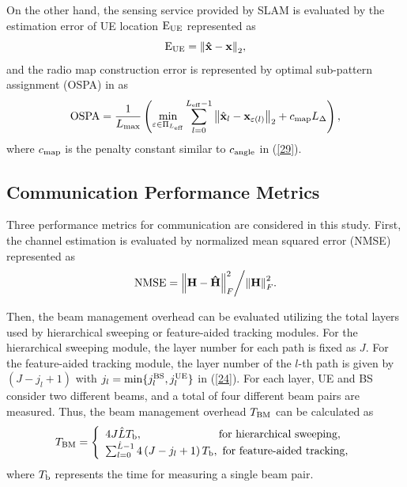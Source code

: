 \documentclass[journal,12pt,onecolumn,draftclsnofoot,]{IEEEtran}
\begin{document}
On the other hand, the sensing service provided by SLAM is evaluated by the estimation error of UE location ${{\rm{E}}_{{\rm{UE}}}}$ represented as
\begin{equation}
\label{30}
{{\rm{E}}_{{\rm{UE}}}} = {\left\| {{\bf{\hat x}} - {\bf{x}}} \right\|}_2,
\end{equation}
and the radio map construction error is represented by optimal sub-pattern assignment (OSPA) in \cite{a6} as 
\begin{equation}
\label{31}
{\rm{OSPA}} = \frac{1}{{{L_{{\rm{max}}}}}}\left({\mathop {\min }\limits_{\varepsilon \in {{\rm{\Pi }}_{{{L_{{\rm{eff}}}}}}}} \mathop \sum \limits_{l = 0}^{{L_{{\rm{eff}}}} - 1} 
\left\|{{\hat {\bf {x}}}_l} - {\bf{x}}_{\varepsilon \left(l \right)}\right\|_2 
+ {c_{{\rm{map}}}}{L_{\rm{\Delta }}}} \right),
\end{equation}
\noindent where ${c_{{\rm{map}}}}$ is the penalty constant similar to ${c_{{\rm{angle}}}}$ in (\ref{29}).
\vspace{-3mm}
\subsection{Communication Performance Metrics}
Three performance metrics for communication are considered in this study.
First, the channel estimation is evaluated by normalized mean squared error (NMSE) represented as 
\begin{equation}
\label{32}
{\rm{NMSE}} = {{ {\left\| {\bf{H}} - {\bf{\hat H}} \right\|}_F^2 }}\bigg/{{ {\left\| {\bf{H}} \right\|}_F^2 }}.
\end{equation}

Then, the beam management overhead can be evaluated utilizing the total layers used by hierarchical sweeping or feature-aided tracking modules. 
For the hierarchical sweeping module, the layer number for each path is fixed as $J$. 
For the feature-aided tracking module, the layer number of the $l$-th path is given by $(J-{j_l}+1)$ with ${j_l} = \min \{ j_l^{{\rm{BS}}},j_l^{{\rm{UE}}}\} $ in (\ref{24}). 
For each layer, UE and BS consider two different beams, and a total of four different beam pairs are measured. Thus, the beam management overhead ${T}_{\rm BM}$ can be calculated as
\begin{equation}
\label{33}
{{{T}}_{{\rm{BM}}}} = \left\{ {\begin{array}{*{20}{l}}
4{J{{\hat L}}{ T_{\rm b}},\;\;\;\;\;\;\;\;\;\;\;\;\;\;\;\;\;\;\;\;\;\;\;\;\;{\mbox{for hierarchical sweeping}}},\\
{\mathop \sum \nolimits_{l = 0}^{{{\hat L}}-1} 4 \left({J - {j_l}}+1 \right){ T_{\rm b}},\,\,{\mbox{for feature-aided tracking}}},
\end{array}} \right. 
\end{equation}
\noindent where ${ T_{\rm b}}$ represents the time for measuring a single beam pair.
\end{document}
